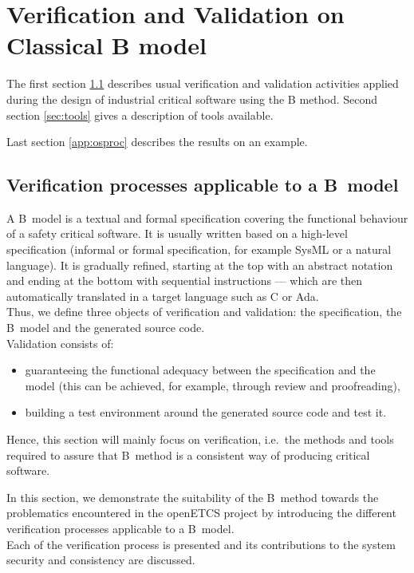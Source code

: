 \section{Verification and Validation on Classical B model}

The first section \ref{sec:processes} describes usual verification and validation activities applied during the design of industrial critical software using the B method. Second section \ref{sec:tools} gives a description of tools available.

Last section \ref{app:osproc} describes the results on an example.


\subsection{Verification processes applicable to a B~model}
\label{sec:processes}

A B~model is a textual and formal specification covering the functional behaviour of a safety critical software. It is usually written based on a high-level specification (informal or formal specification, for example SysML or a natural language). It is gradually refined, starting at the top with an abstract notation and ending at the bottom with sequential instructions --- which are then automatically translated in a target language such as C or Ada.\\
Thus, we define three objects of verification and validation: the specification, the B~model and the generated source code.\\


Validation consists of:
\begin{itemize}
\item guaranteeing the functional adequacy between the specification and the model (this can be achieved, for example, through review and proofreading),
\item building a test environment around the generated source code and test it.
\end{itemize}
Hence, this section will mainly focus on verification, i.e.\ the methods and tools required to assure that B~method is a consistent way of producing critical software.

In this section, we demonstrate the suitability of the B~method towards the problematics encountered in the openETCS project by introducing the different verification processes applicable to a B~model.\\
Each of the verification process is presented and its contributions to the system security and consistency are discussed.

